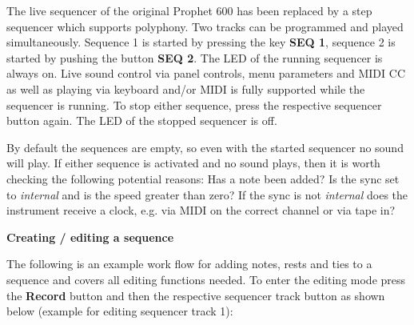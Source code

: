 The live sequencer of the original Prophet 600 has been replaced by a step sequencer which supports polyphony. Two tracks can be programmed and played simultaneously. Sequence 1 is started by pressing the key \textbf{SEQ 1}, sequence 2 is started by pushing the button \textbf{SEQ 2}. The LED of the running sequencer is always on. Live sound control via panel controls, menu parameters and MIDI CC as well as playing via keyboard and/or MIDI is fully supported while the sequencer is running. To stop either sequence, press the respective sequencer button again. The LED of the stopped sequencer is off. 

By default the sequences are empty, so even with the started sequencer no sound will play. If either sequence is activated and no sound plays, then it is worth checking the following potential reasons: Has a note been added? Is the sync set to \textit{internal} and is the speed greater than zero? If the sync is not \textit{internal} does the instrument receive a clock, e.g. via MIDI on the correct channel or via tape in?

\textbf{Creating / editing a sequence}

The following is an example work flow for adding notes, rests and ties to a sequence and covers all editing functions needed. To enter the editing mode press the \textbf{Record} button and then the respective sequencer track button as shown below (example for editing sequencer track 1):

\begin{center}
  
\end{center}

